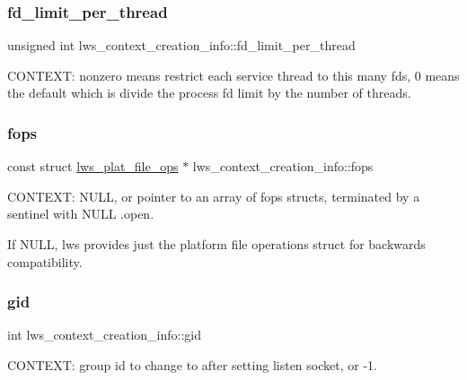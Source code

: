 \subsubsection{\texorpdfstring{fd\+\_\+limit\+\_\+per\+\_\+thread}{fd\_limit\_per\_thread}}
{\footnotesize\ttfamily unsigned int lws\+\_\+context\+\_\+creation\+\_\+info\+::fd\+\_\+limit\+\_\+per\+\_\+thread}

C\+O\+N\+T\+E\+XT\+: nonzero means restrict each service thread to this many fds, 0 means the default which is divide the process fd limit by the number of threads. \mbox{\label{structlws__context__creation__info_acf4b535fcf5f638383183e1919969f7c}} 
\subsubsection{\texorpdfstring{fops}{fops}}
{\footnotesize\ttfamily const struct \hyperlink{structlws__plat__file__ops}{lws\+\_\+plat\+\_\+file\+\_\+ops} $\ast$ lws\+\_\+context\+\_\+creation\+\_\+info\+::fops}

C\+O\+N\+T\+E\+XT\+: N\+U\+LL, or pointer to an array of fops structs, terminated by a sentinel with N\+U\+LL .open.

If N\+U\+LL, lws provides just the platform file operations struct for backwards compatibility. \mbox{\label{structlws__context__creation__info_a9c9d22437de92c197f3cee52912b2c03}} 
\subsubsection{\texorpdfstring{gid}{gid}}
{\footnotesize\ttfamily int lws\+\_\+context\+\_\+creation\+\_\+info\+::gid}

C\+O\+N\+T\+E\+XT\+: group id to change to after setting listen socket, or -\/1. \mbox{\label{structlws__context__creation__info_af8b9d4df584baf136bdcb36e5af6dfbf}} 

